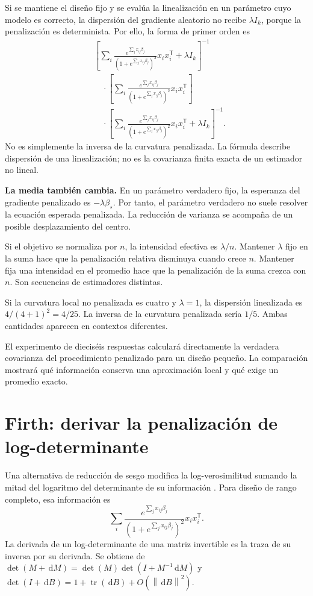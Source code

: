 \documentclass[11pt,a4paper]{article}
\newcommand{\T}{^{\mathsf T}}
\newcommand{\dd}{\,\mathrm d}
\newcommand{\norm}[1]{\left\lVert #1\right\rVert}
\DeclareMathOperator{\tr}{tr}
\begin{document}
Si se mantiene el diseño fijo y se evalúa la
linealización en un parámetro cuyo modelo es correcto,
la dispersión del gradiente aleatorio no recibe
$\lambda I_k$, porque la penalización es determinista.
Por ello, la forma de primer orden es
\[
\begin{aligned}
&\left[
\sum_i\frac{e^{\sum_jx_{ij}\beta_j}}
{(1+e^{\sum_jx_{ij}\beta_j})^2}x_ix_i\T+\lambda I_k
\right]^{-1}\\
&\quad\cdot
\left[
\sum_i\frac{e^{\sum_jx_{ij}\beta_j}}
{(1+e^{\sum_jx_{ij}\beta_j})^2}x_ix_i\T
\right]\\
&\quad\cdot
\left[
\sum_i\frac{e^{\sum_jx_{ij}\beta_j}}
{(1+e^{\sum_jx_{ij}\beta_j})^2}x_ix_i\T+\lambda I_k
\right]^{-1}.
\end{aligned}
\]
No es simplemente la inversa de la curvatura penalizada.
La fórmula describe dispersión de una linealización;
no es la covarianza finita exacta de un estimador no lineal.

\textbf{La media también cambia.}
En un parámetro verdadero fijo, la esperanza del
gradiente penalizado es $-\lambda\beta_\star$.
Por tanto, el parámetro verdadero no suele resolver
la ecuación esperada penalizada.
La reducción de varianza se acompaña de un posible
desplazamiento del centro.

Si el objetivo se normaliza por $n$, la intensidad
efectiva es $\lambda/n$.
Mantener $\lambda$ fijo en la suma hace que la
penalización relativa disminuya cuando crece $n$.
Mantener fija una intensidad en el promedio hace
que la penalización de la suma crezca con $n$.
Son secuencias de estimadores distintas.

\begin{ejemplo}
Si la curvatura local no penalizada es cuatro
y $\lambda=1$, la dispersión linealizada es
$4/(4+1)^2=4/25$.
La inversa de la curvatura penalizada sería $1/5$.
Ambas cantidades aparecen en contextos diferentes.
\end{ejemplo}
El experimento de dieciséis respuestas calculará
directamente la verdadera covarianza del procedimiento
penalizado para un diseño pequeño.
La comparación mostrará qué información conserva
una aproximación local y qué exige un promedio exacto.

\clearpage
\section{Firth: derivar la penalización de log-determinante}\label{logit68}
Una alternativa de reducción de sesgo modifica la
log-verosimilitud sumando la mitad del logaritmo
del determinante de su información \cite{firth}.
Para diseño de rango completo, esa información es
\[
\sum_i\frac{e^{\sum_jx_{ij}\beta_j}}
{(1+e^{\sum_jx_{ij}\beta_j})^2}x_ix_i\T.
\]
La derivada de un log-determinante de una matriz
invertible es la traza de su inversa por su derivada.
Se obtiene de
$\det(M+\dd M)=\det(M)\det(I+M^{-1}\dd M)$
y $\det(I+\dd B)=1+\tr(\dd B)+O(\norm{\dd B}^2)$.
\end{document}

